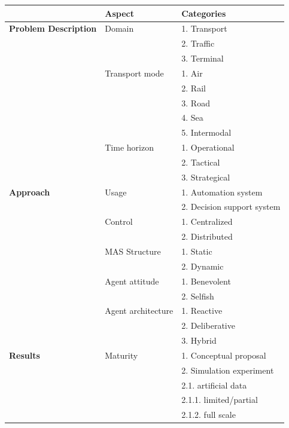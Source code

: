 \documentclass[11pt,letterpaper,onecolumn,twoside,openright,final]{report}
\begin{document}
\begin{table}[htbp]
    \centering
    \begin{tabular}{lp{}p{}}
    \addlinespace
    & \textbf{Aspect} & \textbf{Categories} \\
    \hline\hline
    \textbf{Problem Description} & Domain & 1. Transport \\
        &       & 2. Traffic \\
        &       & 3. Terminal \\
    \cline{2-3}
        & Transport mode & 1. Air \\
        &       & 2. Rail \\
        &       & 3. Road \\
        &       & 4. Sea \\
        &       & 5. Intermodal \\
    \cline{2-3}
        & Time horizon & 1. Operational \\
        &       & 2. Tactical \\
        &       & 3. Strategical \\
        \hline
    \textbf{Approach} & Usage & 1. Automation system \\
        &       & 2. Decision support system \\
    \cline{2-3} & Control & 1. Centralized \\ &       & 2. Distributed \\
    \cline{2-3} & MAS Structure & 1. Static \\ &       & 2. Dynamic \\
    \cline{2-3} & Agent attitude & 1. Benevolent \\ &       & 2. Selfish \\
    \cline{2-3}
        & Agent architecture & 1. Reactive \\
        &       & 2. Deliberative \\
        &       & 3. Hybrid \\
    \hline
    \textbf{Results} & Maturity & 1. Conceptual proposal \\
        &       & 2. Simulation experiment \\
        &       &   2.1. artificial data \\
        &       &     2.1.1. limited/partial \\
        &       &     2.1.2. full scale \\

\end{tabular}
\end{table}
\end{document}
